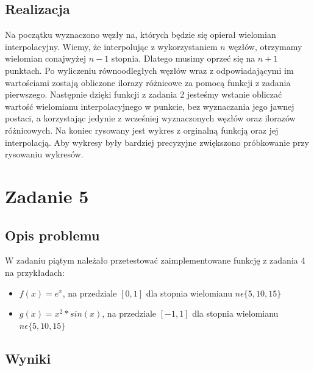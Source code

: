 \documentclass[]{article}
\begin{document}
\subsection{Realizacja}
Na początku wyznaczono węzły na, których będzie się opierał wielomian interpolacyjny. Wiemy, że interpolując z wykorzystaniem $n$ węzłów, otrzymamy wielomian conajwyżej $n-1$ stopnia. Dlatego musimy oprzeć się na $n+1$ punktach. Po wyliczeniu równoodległych węzłów wraz z odpowiadającymi im wartościami zostają obliczone ilorazy różnicowe za pomocą funkcji z zadania pierwszego. Następnie dzięki funkcji z zadania 2 jesteśmy wstanie obliczać wartość wielomianu interpolacyjnego w punkcie, bez wyznaczania jego jawnej postaci, a korzystając jedynie z wcześniej wyznaczonych węzłów oraz ilorazów różnicowych. Na koniec rysowany jest wykres z orginalną funkcją oraz jej interpolacją. Aby wykresy były bardziej precyzyjne zwiększono próbkowanie przy rysowaniu wykresów. 
\section{Zadanie 5}
\subsection{Opis problemu}
W zadaniu piątym należało przetestować zaimplementowane funkcję z zadania 4 na przykładach:
\begin{itemize}
	\item $f(x) = e^x$, na przedziale $[0, 1]$ dla stopnia wielomianu $n \epsilon \{5, 10, 15\}$
	\item $g(x) = x^2 * sin(x)$, na przedziale $[-1, 1]$ dla stopnia wielomianu $n \epsilon \{5, 10, 15\}$
\end{itemize}
\subsection{Wyniki}
\end{document}
